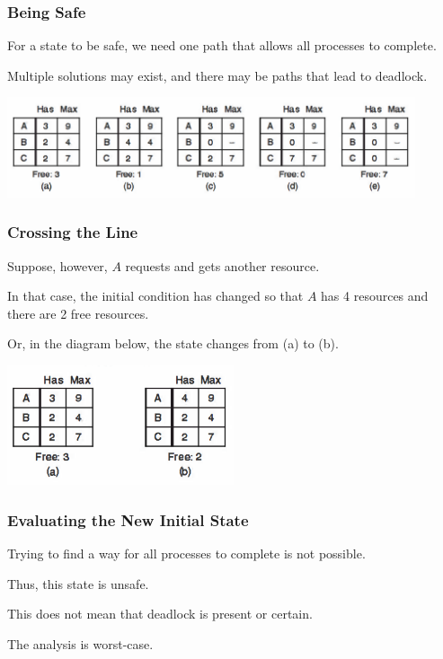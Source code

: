 \begin{frame}
\frametitle{Being Safe}


For a state to be safe, we need one path that allows all processes to complete. 

Multiple solutions may exist, and there may be paths that lead to deadlock. 

\begin{center}
\includegraphics[width=0.9\textwidth]{images/safe-state.png}
\end{center}


\end{frame}

\begin{frame}
\frametitle{Crossing the Line}

Suppose, however, $A$ requests and gets another resource. 

In that case, the initial condition has changed so that $A$ has 4 resources and there are 2 free resources. 

Or, in the diagram below, the state changes from (a) to (b).

\begin{center}
\includegraphics[width=0.5\textwidth]{images/unsafe-state-initial.png}
\end{center}


\end{frame}

\begin{frame}
\frametitle{Evaluating the New Initial State}

Trying to find a way for all processes to complete is not possible.

Thus, this state is unsafe.

This does not mean that deadlock is present or certain. 

The analysis is worst-case.

\end{frame}

